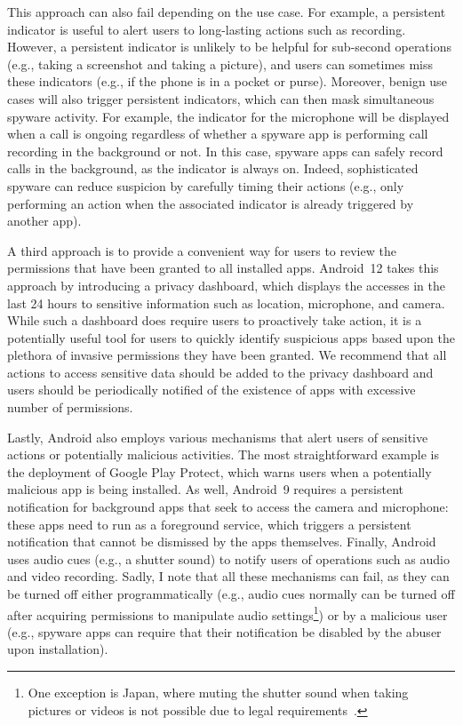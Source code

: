 This approach can also fail depending on the use case.  For example, a
persistent indicator is useful to alert users to long-lasting actions
such as recording. However, a persistent indicator is unlikely to be
helpful for sub-second operations (e.g., taking a screenshot and
taking a picture),
and users can sometimes miss these indicators (e.g., if the phone is
in a pocket or purse).  Moreover, benign use cases will also trigger
persistent indicators, which can then mask simultaneous spyware activity.  For example, the indicator for the microphone will be
displayed when a call is ongoing regardless of whether a spyware app
is performing call recording in the background or not.  In this case,
spyware apps can safely record calls in the background, as the
indicator is always on.  Indeed, sophisticated spyware can reduce
suspicion by carefully timing their actions (e.g., only performing an
action when the associated indicator is already triggered by another
app).

A third approach is to provide a convenient way for users to review the
permissions that have been granted to all installed apps.  Android~12 takes this
approach by introducing a privacy dashboard, which displays the
accesses in the last 24 hours to sensitive information such as location, microphone, and camera.
While such a dashboard does require users to proactively
take action, it is a potentially useful tool for users to quickly identify
suspicious apps based upon the plethora of invasive permissions they have been
granted. We
recommend that all actions to access sensitive data should be added to the
privacy dashboard and users should be periodically notified of the existence of apps with excessive number of permissions.

Lastly, Android also employs various mechanisms that alert users of sensitive actions or potentially malicious activities. 
The most straightforward example is the deployment of Google Play Protect, which warns users when a potentially malicious app is being installed. As well, Android~9 requires a persistent notification for background apps that seek to access the camera and microphone: these apps need to run as a foreground service, which triggers a persistent notification that cannot be dismissed by the apps themselves. Finally, Android uses audio cues (e.g., a shutter sound) to notify users of operations such as audio and video recording. Sadly, I note that all these mechanisms can fail, as they can be turned off either programmatically (e.g., audio cues normally can be
turned off after acquiring permissions to manipulate audio
settings\footnote{One exception is Japan, where muting the shutter sound when
taking pictures or videos is not possible due to legal
requirements~\cite{HowcanIt38:online}.}) or by a malicious user (e.g., spyware apps can require that their notification be disabled by the abuser upon installation).


